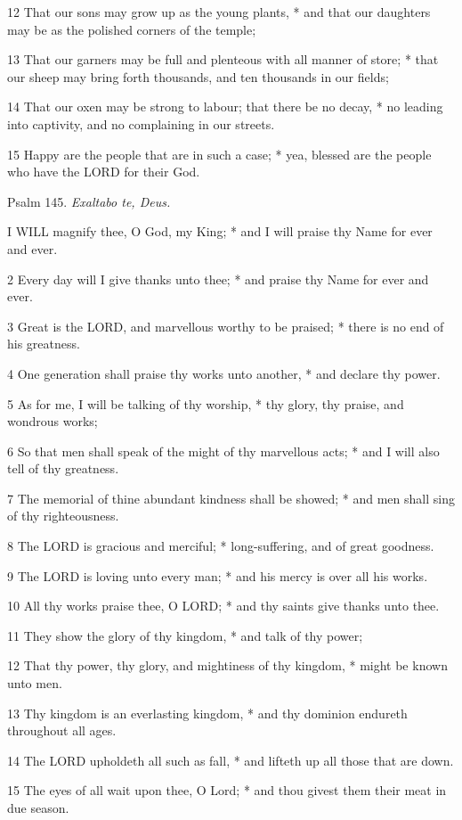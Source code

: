 12 That our sons may grow up as the young plants, *
and that our daughters may be as the polished corners of the temple;

13 That our garners may be full and plenteous with
all manner of store; * that our sheep may bring forth thousands, and
ten thousands in our fields;

14 That our oxen may be strong to labour; that there
be no decay, * no leading into captivity, and no complaining in our streets.

15 Happy are the people that are in such a case; *
yea, blessed are the people who have the LORD for their God.

Psalm
145. \emph{Exaltabo te, Deus.}

I
WILL magnify thee, O God, my King; * and I will praise thy Name for ever
and ever.

2 Every day will I give thanks unto thee; * and praise
thy Name for ever and ever.

3 Great is the LORD, and marvellous worthy to be praised;
* there is no end of his greatness.

4 One generation shall praise thy works unto another,
* and declare thy power.

5 As for me, I will be talking of thy worship, * thy
glory, thy praise, and wondrous works;

6 So that men shall speak of the might of thy marvellous
acts; * and I will also tell of thy greatness.

7 The memorial of thine abundant kindness shall be
showed; * and men shall sing of thy righteousness.

8 The LORD is gracious and merciful; * long-suffering,
and of great goodness.

9 The LORD is loving unto every man; * and his mercy
is over all his works.

10 All thy works praise thee, O LORD; * and thy saints
give thanks unto thee.

11 They show the glory of thy kingdom, * and talk of
thy power;

12 That thy power, thy glory, and mightiness of thy
kingdom, * might be known unto men.

13 Thy kingdom is an everlasting kingdom, * and thy
dominion endureth throughout all ages.

14 The LORD upholdeth all such as fall, * and lifteth
up all those that are down.

15 The eyes of all wait upon thee, O Lord; * and thou
givest them their meat in due season.

